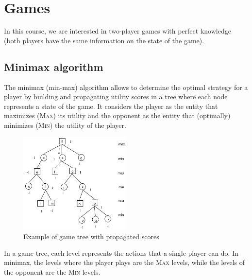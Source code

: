 \chapter{Games}

In this course, we are interested in two-player games with 
perfect knowledge (both players have the same information on the state of the game).


\section{Minimax algorithm}
The minimax (min-max) algorithm allows to determine the optimal strategy for a player by
building and propagating utility scores in a tree where each node represents a state of the game.
It considers the player as the entity that maximizes (\textsc{Max}) its utility and
the opponent as the entity that (optimally) minimizes (\textsc{Min}) the utility of the player.


\begin{figure}[h]
    \centering
    \includegraphics[width=0.5\textwidth]{img/_minmax.pdf}
    \caption{Example of game tree with propagated scores}
\end{figure}

In a game tree, each level represents the actions that a single player can do.
In minimax, the levels where the player plays are the \textsc{Max} levels, 
while the levels of the opponent are the \textsc{Min} levels.

